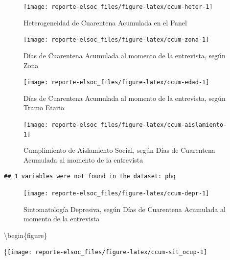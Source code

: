 \documentclass[
  12pt,
  openany]{book}
\begin{document}
\begin{figure}

{\centering \texttt{[image: reporte-elsoc\_files/figure-latex/ccum-heter-1]} 

}

\caption{Heterogeneidad de Cuarentena Acumulada en el Panel}\label{fig:ccum-heter}
\end{figure}

\begin{figure}

{\centering \texttt{[image: reporte-elsoc\_files/figure-latex/ccum-zona-1]} 

}

\caption{Días de Cuarentena Acumulada al momento de la entrevista, según Zona}\label{fig:ccum-zona}
\end{figure}

\begin{figure}

{\centering \texttt{[image: reporte-elsoc\_files/figure-latex/ccum-edad-1]} 

}

\caption{Días de Cuarentena Acumulada al momento de la entrevista, según Tramo Etario}\label{fig:ccum-edad}
\end{figure}

\begin{figure}

{\centering \texttt{[image: reporte-elsoc\_files/figure-latex/ccum-aislamiento-1]} 

}

\caption{Cumplimiento de Aislamiento Social, según Días de Cuarentena Acumulada al momento de la entrevista}\label{fig:ccum-aislamiento}
\end{figure}

\begin{verbatim}
## 1 variables were not found in the dataset: phq
\end{verbatim}

\begin{figure}

{\centering \texttt{[image: reporte-elsoc\_files/figure-latex/ccum-depr-1]} 

}

\caption{Sintomatología Depresiva, según Días de Cuarentena Acumulada al momento de la entrevista}\label{fig:ccum-depr}
\end{figure}

\textbackslash begin\{figure\}

\{\centering \texttt{[image: reporte-elsoc\_files/figure-latex/ccum-sit\_ocup-1]}
\end{document}
